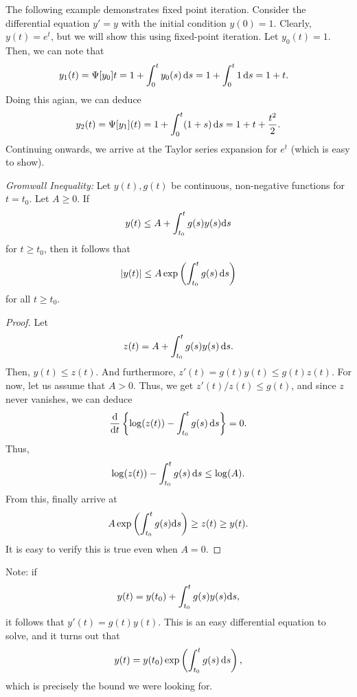 \documentclass{article}
\begin{document}

\begin{example}
    The following example demonstrates fixed point iteration. Consider the differential equation $y' = y$ with the initial condition $y(0) = 1$. Clearly, $y(t) = e^t$, but we will show this using fixed-point iteration. Let $y_0(t) = 1$. Then, we can note that 
    \begin{align*}
        y_1(t) &= \Psi[y_0]{t} = 1 + \int_{0}^t y_0(s) \, \text{d}s = 1 + \int_{0}^t 1 \, \text{d}s = 1 + t.
    \end{align*}
    Doing this agian, we can deduce 
        \[
            y_2(t) = \Psi[y_1](t) = 1 + \int_0^t (1 + s) \, \text{d}s = 1 + t + \frac{t^2}{2}.
        \]
    Continuing onwards, we arrive at the Taylor series expansion for $e^t$ (which is easy to show). 
\end{example}



\begin{theorem}[Lemma.]{}
    \textit{Gromwall Inequality:} Let $y(t), g(t)$ be continuous, non-negative functions for $t = t_0$. Let $A \geq 0$. If 
        \[
            y(t) \leq A + \int_{t_0}^t g(s)y(s) \text{d}s
        \]
    for $t \geq t_0$, then it follows that 
        \[
            |y(t)| \leq A \exp \left( \int_{t_0}^t g(s) \, \text{d}s \right)
        \]
    for all $t \geq t_0$. 
\end{theorem}
\begin{proof}
    Let 
    \[
        z(t) = A + \int_{t_0}^t g(s) y(s) \, \text{d}s.
    \]
    Then, $y(t) \leq z(t)$. And furthermore, $z'(t) = g(t)y(t) \leq g(t)z(t)$. For now, let us assume that $A > 0$. Thus, we get $z'(t) / z(t) \leq g(t)$, and since $z$ never vanishes, we can deduce 
        \[
         \dv{}{t}\left\{\log(z(t)) - \int_{t_0}^t g(s) \, \text{d}s \right\} = 0.
        \]
    Thus, 
        \[
            \log(z(t)) - \int_{t_0}^t g(s) \, \text{d}s  \leq \log(A).
        \] 
    From this, finally arrive at 
        \[
            A \exp \left(\int_{t_0}^t g(s) \text{d}s \right) \geq z(t) \geq y(t).
        \]
    It is easy to verify this is true even when $A = 0$. 
\end{proof}
 

Note: if 
    \[
        y(t) = y(t_0) + \int_{t_0}^t g(s)y(s) \text{d}s,
    \]
it follows that $y'(t) = g(t)y(t)$. This is an easy differential equation to solve, and it turns out that 
    \[
        y(t) = y(t_0) \exp \left( \int_{t_0}^t g(s) \, \text{d}s\right),
    \]
which is precisely the bound we were looking for.  
\end{document}
